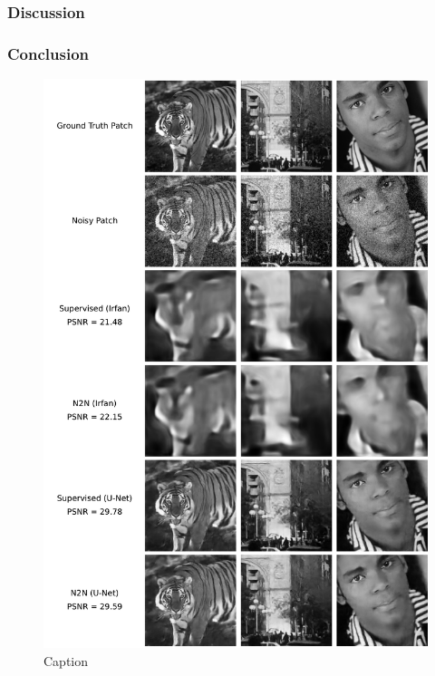 \subsubsection{Discussion}

\subsubsection{Conclusion}

\begin{figure}
    \centering
    \includegraphics[width=\textwidth]{img/ch6/n2n_imagenet/denoising_comparison.pdf}
    \caption{Caption}
\end{figure}

    
